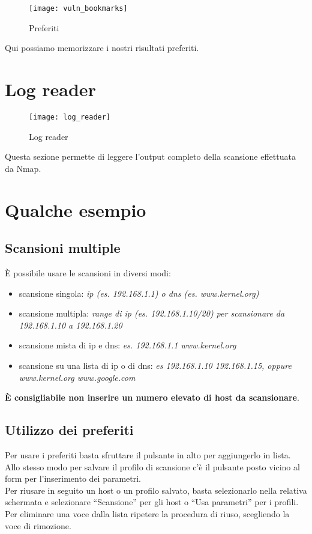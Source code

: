 \begin{figure}[h]
  \centering
  \texttt{[image: vuln\_bookmarks]}
  \caption{Preferiti}
  \label{fig:VulnerabilityBookmarks}
\end{figure}
Qui possiamo memorizzare i nostri risultati preferiti.


\chapter{Log reader}
\label{ch:LogReader}

\begin{figure}[h]
  \centering
  \texttt{[image: log\_reader]}
  \caption{Log reader}
  \label{fig:LodReader}
\end{figure}
Questa sezione permette di leggere l'output completo della scansione 
effettuata da Nmap.

\chapter{Qualche esempio}
\label{ch:Examples}

\section{Scansioni multiple}
\label{sec:ExamplesMultipleScan}

\`E possibile usare le scansioni in diversi modi:
\begin{itemize}
\item scansione singola: \emph{ip (es. 192.168.1.1) o dns (es. www.kernel.org)}
\item scansione multipla: \emph{range di ip (es. 192.168.1.10/20) per scansionare 
  da 192.168.1.10 a 192.168.1.20}
\item scansione mista di ip e dns: \emph{es. 192.168.1.1 www.kernel.org}
\item scansione su una lista di ip o di dns: \emph{es 192.168.1.10 192.168.1.15, 
  oppure www.kernel.org www.google.com}
\end{itemize}
\textbf{\`E consigliabile non inserire un numero elevato di host da scansionare}.

\section{Utilizzo dei preferiti}
\label{sec:ExamplesUseBookmarks}

Per usare i preferiti basta sfruttare il pulsante in alto per aggiungerlo in lista.\\
Allo stesso modo per salvare il profilo di scansione c'\`e il pulsante posto vicino 
al form per l'inserimento dei parametri.\\
Per riusare in seguito un host o un profilo salvato, basta selezionarlo nella relativa 
schermata e selezionare ``Scansione'' per gli host o ``Usa parametri'' per i profili.\\ 
Per eliminare una voce dalla lista ripetere la procedura di riuso, scegliendo la voce di 
rimozione.
